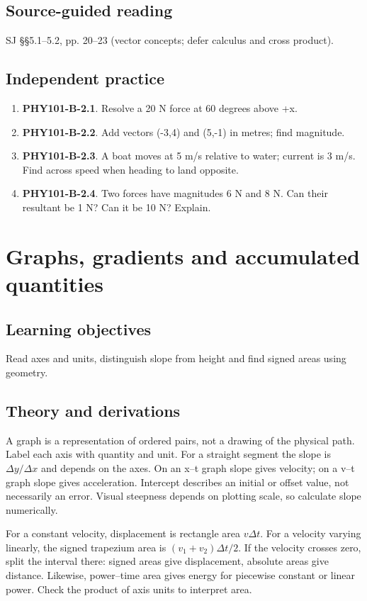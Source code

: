 \documentclass[11pt,a4paper,openany]{book}
\begin{document}
\section{Source-guided reading}
SJ §§5.1–5.2, pp. 20–23 (vector concepts; defer calculus and cross product).
\section{Independent practice}
\begin{enumerate}
\item \textbf{PHY101-B-2.1}. Resolve a 20 N force at 60 degrees above +x.
\item \textbf{PHY101-B-2.2}. Add vectors (-3,4) and (5,-1) in metres; find magnitude.
\item \textbf{PHY101-B-2.3}. A boat moves at 5 m/s relative to water; current is 3 m/s. Find across speed when heading to land opposite.
\item \textbf{PHY101-B-2.4}. Two forces have magnitudes 6 N and 8 N. Can their resultant be 1 N? Can it be 10 N? Explain.
\end{enumerate}
\chapter{Graphs, gradients and accumulated quantities}
\section{Learning objectives}
Read axes and units, distinguish slope from height and find signed areas using geometry.
\section{Theory and derivations}
A graph is a representation of ordered pairs, not a drawing of the physical path. Label each axis with quantity and unit. For a straight segment the slope is $\Delta y/\Delta x$ and depends on the axes. On an x–t graph slope gives velocity; on a v–t graph slope gives acceleration. Intercept describes an initial or offset value, not necessarily an error. Visual steepness depends on plotting scale, so calculate slope numerically.

For a constant velocity, displacement is rectangle area $v\Delta t$. For a velocity varying linearly, the signed trapezium area is $(v_1+v_2)\Delta t/2$. If the velocity crosses zero, split the interval there: signed areas give displacement, absolute areas give distance. Likewise, power–time area gives energy for piecewise constant or linear power. Check the product of axis units to interpret area.
\end{document}
